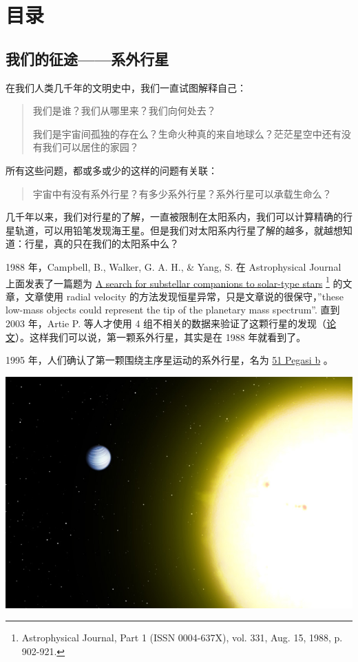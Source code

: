 \documentclass[letterpaper,10pt,english]{sphinxmanual}
\begin{document}
\chapter{目录}
\label{index:id3}\label{index:id1}

\section{我们的征途——系外行星}
\label{intro::doc}\label{intro:id1}
在我们人类几千年的文明史中，我们一直试图解释自己：
\begin{quote}

我们是谁？我们从哪里来？我们向何处去？

我们是宇宙间孤独的存在么？生命火种真的来自地球么？茫茫星空中还有没有我们可以居住的家园？
\end{quote}

所有这些问题，都或多或少的这样的问题有关联：
\begin{quote}

宇宙中有没有系外行星？有多少系外行星？系外行星可以承载生命么？
\end{quote}

几千年以来，我们对行星的了解，一直被限制在太阳系内，我们可以计算精确的行星轨道，可以用铅笔发现海王星。但是我们对太阳系内行星了解的越多，就越想知道：行星，真的只在我们的太阳系中么？

1988 年，Campbell, B., Walker, G. A. H., \& Yang, S. 在 Astrophysical Journal 上面发表了一篇题为 \href{http://adsbit.harvard.edu/cgi-bin/nph-iarticle\_query?bibcode=1988ApJ...331..902C}{A search for substellar companions to solar-type stars} \footnote{
Astrophysical Journal, Part 1 (ISSN 0004-637X), vol. 331, Aug. 15, 1988, p. 902-921.
} 的文章，文章使用 radial velocity 的方法发现恒星异常，只是文章说的很保守，''these low-mass objects could represent the tip of the planetary mass spectrum''. 直到 2003 年，Artie P. 等人才使用 4 组不相关的数据来验证了这颗行星的发现（\href{http://arxiv.org/abs/astro-ph/0305110}{论文}）。这样我们可以说，第一颗系外行星，其实是在 1988 年就看到了。

1995 年，人们确认了第一颗围绕主序星运动的系外行星，名为 \href{http://en.wikipedia.org/wiki/51\_Pegasi}{51 Pegasi b} 。

\includegraphics{51_Pegasi_b_v3.jpg}
\end{document}
